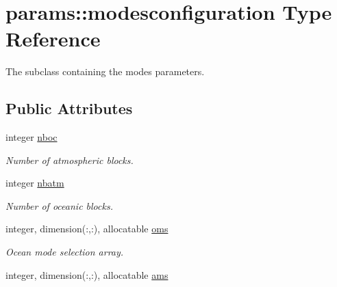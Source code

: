 \hypertarget{structparams_1_1modesconfiguration}{}\section{params\+:\+:modesconfiguration Type Reference}
\label{structparams_1_1modesconfiguration}


The subclass containing the modes parameters.  


\subsection*{Public Attributes}
\begin{DoxyCompactItemize}
\item 
\mbox{\label{structparams_1_1modesconfiguration_a69a0793ecee9913a43b12001b3bd96ba}} 
integer \hyperlink{structparams_1_1modesconfiguration_a69a0793ecee9913a43b12001b3bd96ba}{nboc}
\begin{DoxyCompactList}\small\item\em Number of atmospheric blocks. \end{DoxyCompactList}\item 
\mbox{\label{structparams_1_1modesconfiguration_a26c0b1a58aa2ac7a17b59cf4ec0a1be8}} 
integer \hyperlink{structparams_1_1modesconfiguration_a26c0b1a58aa2ac7a17b59cf4ec0a1be8}{nbatm}
\begin{DoxyCompactList}\small\item\em Number of oceanic blocks. \end{DoxyCompactList}\item 
\mbox{\label{structparams_1_1modesconfiguration_a10bce57d0b89eaf60320cec21bb75857}} 
integer, dimension(\+:,\+:), allocatable \hyperlink{structparams_1_1modesconfiguration_a10bce57d0b89eaf60320cec21bb75857}{oms}
\begin{DoxyCompactList}\small\item\em Ocean mode selection array. \end{DoxyCompactList}\item 
\mbox{\label{structparams_1_1modesconfiguration_aa011e841259b6bfb4fd691fbc31154b3}} 
integer, dimension(\+:,\+:), allocatable \hyperlink{structparams_1_1modesconfiguration_aa011e841259b6bfb4fd691fbc31154b3}{ams}

\end{DoxyCompactItemize}
